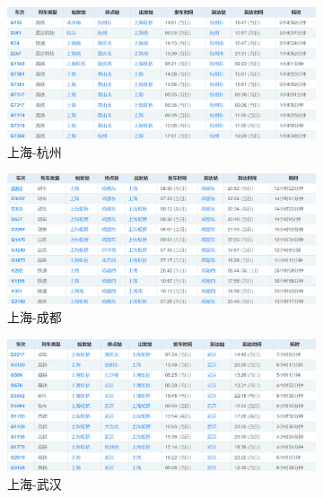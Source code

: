 \documentclass[12pt, a4paper, oneside]{ctexart}
\begin{document}
\begin{figure}[htbp]
\begin{subfigure}{0.3\linewidth}
    \end{subfigure}
    \vspace{0.5cm}
    \begin{subfigure}{0.3\linewidth}
        \includegraphics[width=\linewidth]{src/S_H.png}
        \caption{上海-杭州}
    \end{subfigure}
    \begin{subfigure}{0.3\linewidth}
        \includegraphics[width=\linewidth]{src/S_C.png}
        \caption{上海-成都}
    \end{subfigure}
    \begin{subfigure}{0.3\linewidth}
        \includegraphics[width=\linewidth]{src/S_w.png}
        \caption{上海-武汉}
    \end{subfigure}
    \vspace{0.5cm}
    \begin{subfigure}{0.3\linewidth}

\end{subfigure}
\end{figure}
\end{document}
